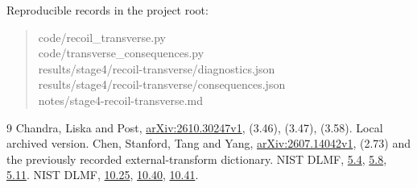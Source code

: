\documentclass[11pt,a4paper]{article}
\begin{document}
\small
Reproducible records in the project root:
\begin{quote}\footnotesize
code/recoil\_transverse.py\\
code/transverse\_consequences.py\\
results/stage4/recoil-transverse/diagnostics.json\\
results/stage4/recoil-transverse/consequences.json\\
notes/stage4-recoil-transverse.md
\end{quote}
\begin{thebibliography}{9}
 Chandra, Liska and Post,
\href{https://arxiv.org/html/2610.30247v1}{arXiv:2610.30247v1},
(3.46), (3.47), (3.58). Local archived version.
 Chen, Stanford, Tang and Yang,
\href{https://arxiv.org/html/2607.14042v1}{arXiv:2607.14042v1},
(2.73) and the previously recorded external-transform dictionary.
 NIST DLMF,
\href{https://dlmf.nist.gov/5.4}{5.4},
\href{https://dlmf.nist.gov/5.8}{5.8},
\href{https://dlmf.nist.gov/5.11}{5.11}.
 NIST DLMF,
\href{https://dlmf.nist.gov/10.25}{10.25},
\href{https://dlmf.nist.gov/10.40}{10.40},
\href{https://dlmf.nist.gov/10.41}{10.41}.
\end{thebibliography}
\end{document}
